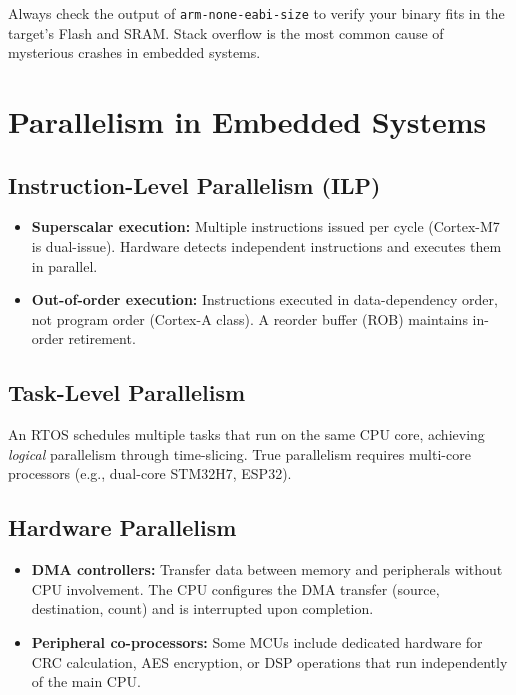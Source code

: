\begin{practicalNote}
Always check the output of \texttt{arm-none-eabi-size} to verify your binary fits in the target's Flash and SRAM. Stack overflow is the most common cause of mysterious crashes in embedded systems.
\end{practicalNote}

\section{Parallelism in Embedded Systems}
\label{sec:proc:parallelism}

\subsection{Instruction-Level Parallelism (ILP)}

\begin{itemize}
  \item \textbf{Superscalar execution:} Multiple instructions issued per cycle (Cortex-M7 is dual-issue). Hardware detects independent instructions and executes them in parallel.
  \item \textbf{Out-of-order execution:} Instructions executed in data-dependency order, not program order (Cortex-A class). A reorder buffer (ROB) maintains in-order retirement.
\end{itemize}

\subsection{Task-Level Parallelism}

An RTOS schedules multiple tasks that run on the same CPU core, achieving \emph{logical} parallelism through time-slicing. True parallelism requires multi-core processors (e.g., dual-core STM32H7, ESP32).

\subsection{Hardware Parallelism}

\begin{itemize}
  \item \textbf{DMA controllers:} Transfer data between memory and peripherals without CPU involvement. The CPU configures the DMA transfer (source, destination, count) and is interrupted upon completion.
  \item \textbf{Peripheral co-processors:} Some MCUs include dedicated hardware for CRC calculation, AES encryption, or DSP operations that run independently of the main CPU.
\end{itemize}

